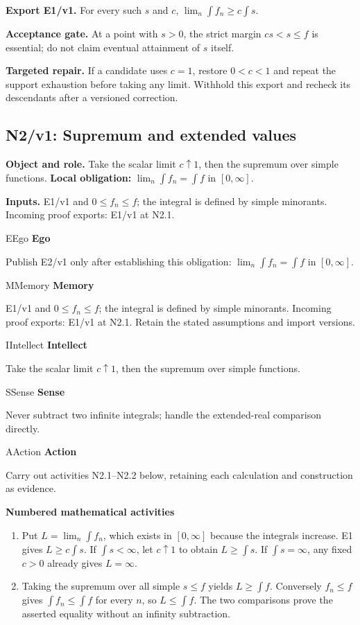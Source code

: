 \documentclass[preprint,12pt,aps,pra,showkeys,amsmath,amssymb,superscriptaddress,floatfix]{revtex4-2}
\theoremstyle{definition}
\theoremstyle{remark}
\newcommand{\mmfaculty}[3]{%
 \begin{mmfacultybox}{#1}{#2}
 {\sffamily\bfseries\color{MMBlue}#2}\par\smallskip #3
 \end{mmfacultybox}}
\newcommand{\field}[2]{\par\smallskip\noindent\textbf{#1.} #2\par}
\begin{document}
\field{Export E1/v1}{For every such \(s\) and \(c\), \(\lim_n\int f_n\ge c\int s\).}

\field{Acceptance gate}{At a point with \(s>0\), the strict margin \(cs<s\le f\) is essential;
do not claim eventual attainment of \(s\) itself.}

\field{Targeted repair}{If a candidate uses \(c=1\), restore \(0<c<1\) and repeat the support
exhaustion before taking any limit. Withhold this export and recheck its
descendants after a versioned correction.}

\clearpage

\subsection{N2/v1: Supremum and extended values}

\field{Object and role}{Take the scalar limit \(c\uparrow1\), then the supremum over simple
functions. \textbf{Local obligation:} \(\lim_n\int f_n=\int f\) in
\([0,\infty]\).}

\field{Inputs}{E1/v1 and \(0\le f_n\le f\); the integral is defined by simple
minorants. Incoming proof exports: E1/v1 at N2.1.}

\mmfaculty{E}{Ego}{Publish E2/v1 only after establishing this obligation:
\(\lim_n\int f_n=\int f\) in \([0,\infty]\).}

\mmfaculty{M}{Memory}{E1/v1 and \(0\le f_n\le f\); the integral is defined by simple
minorants. Incoming proof exports: E1/v1 at N2.1. Retain the stated
assumptions and import versions.}

\mmfaculty{I}{Intellect}{Take the scalar limit \(c\uparrow1\), then the supremum over simple
functions.}

\mmfaculty{S}{Sense}{Never subtract two infinite integrals; handle the extended-real
comparison directly.}

\mmfaculty{A}{Action}{Carry out activities N2.1--N2.2 below, retaining each calculation and
construction as evidence.}

\smallskip\noindent\textbf{Numbered mathematical activities}

\begin{enumerate}[label=N2.\arabic*,leftmargin=3.4em]

\item Put \(L=\lim_n\int f_n\), which exists in \([0,\infty]\) because the
integrals increase. E1 gives \(L\ge c\int s\). If \(\int s<\infty\), let
\(c\uparrow1\) to obtain \(L\ge\int s\). If \(\int s=\infty\), any fixed
\(c>0\) already gives \(L=\infty\).

\item Taking the supremum over all simple \(s\le f\) yields \(L\ge\int f\).
Conversely \(f_n\le f\) gives \(\int f_n\le\int f\) for every \(n\), so
\(L\le\int f\). The two comparisons prove the asserted equality without
an infinity subtraction.

\end{enumerate}
\end{document}
